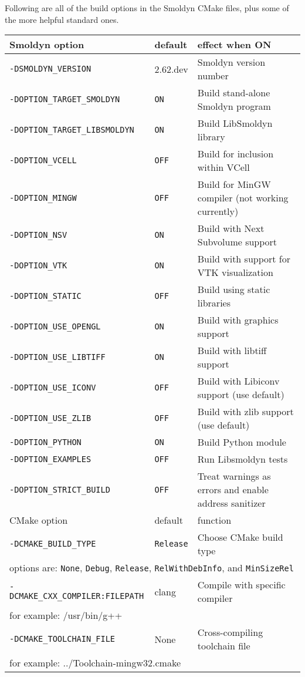 \documentclass {scrbook}
\newcommand {\ttt} {\texttt}
\begin{document}
Following are all of the build options in the Smoldyn CMake files, plus some of the more helpful standard ones.

\begin{longtable}[c]{lll}
Smoldyn option & default & effect when ON\\
\hline
\ttt{-DSMOLDYN\_VERSION} & 2.62.dev & Smoldyn version number\\
\ttt{-DOPTION\_TARGET\_SMOLDYN} & \ttt{ON} & Build stand-alone Smoldyn program\\
\ttt{-DOPTION\_TARGET\_LIBSMOLDYN} & \ttt{ON} & Build LibSmoldyn library\\
\ttt{-DOPTION\_VCELL} & \ttt{OFF} & Build for inclusion within VCell\\
\ttt{-DOPTION\_MINGW} & \ttt{OFF} & Build for MinGW compiler (not working currently)\\
\ttt{-DOPTION\_NSV} & \ttt{ON} & Build with Next Subvolume support\\
\ttt{-DOPTION\_VTK} & \ttt{ON} & Build with support for VTK visualization\\
\ttt{-DOPTION\_STATIC} & \ttt{OFF} & Build using static libraries\\
\ttt{-DOPTION\_USE\_OPENGL} & \ttt{ON} & Build with graphics support\\
\ttt{-DOPTION\_USE\_LIBTIFF} & \ttt{ON} & Build with libtiff support\\
\ttt{-DOPTION\_USE\_ICONV} & \ttt{OFF} & Build with Libiconv support (use default)\\
\ttt{-DOPTION\_USE\_ZLIB} & \ttt{OFF} & Build with zlib support (use default)\\
\ttt{-DOPTION\_PYTHON} & \ttt{ON} & Build Python module\\
\ttt{-DOPTION\_EXAMPLES} & \ttt{OFF} & Run Libsmoldyn tests\\
\ttt{-DOPTION\_STRICT\_BUILD} & \ttt{OFF} & Treat warnings as errors and enable address sanitizer\\
\hline
CMake option & default & function\\
\hline
\ttt{-DCMAKE\_BUILD\_TYPE} & \ttt{Release} & Choose CMake build type\\
\multicolumn{3}{l}{\hspace{0.3in}options are: \ttt{None}, \ttt{Debug}, \ttt{Release}, \ttt{RelWithDebInfo}, and \ttt{MinSizeRel}}\\
\ttt{-DCMAKE\_CXX\_COMPILER:FILEPATH} & clang & Compile with specific compiler\\
\multicolumn{3}{l}{\hspace{0.3in}for example: /usr/bin/g++}\\
\ttt{-DCMAKE\_TOOLCHAIN\_FILE} & None & Cross-compiling toolchain file \\
\multicolumn{3}{l}{\hspace{0.3in}for example: ../Toolchain-mingw32.cmake}\\
\end{longtable}
\end{document}
